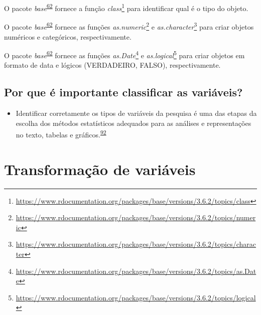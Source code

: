 \documentclass[
  a4paper,
]{book}
\providecommand{\tightlist}{%
  \setlength{\itemsep}{0pt}\setlength{\parskip}{0pt}}
\renewcommand{\href}[2]{#2\footnote{\url{#1}}}
\newenvironment{infobox}[1]
  {
  \begin{itemize}
  \renewcommand{\labelitemi}{
    \raisebox{-.7\height}[0pt][0pt]{
      {\setkeys{Gin}{width=3em,keepaspectratio}
        \texttt{[image: \#1]}}
    }
  }
  \setlength{\fboxsep}{1em}
  \begin{blackbox}
  \item
  }
  {
  \end{blackbox}
  \end{itemize}
  }
\begin{document}
\begin{infobox}{images/Rlogo}
O pacote \emph{base}\textsuperscript{\protect\hyperlink{ref-base-2}{62}} fornece a função \href{https://www.rdocumentation.org/packages/base/versions/3.6.2/topics/class}{\emph{class}} para identificar qual é o tipo do objeto.

\end{infobox}

\begin{infobox}{images/Rlogo}
O pacote \emph{base}\textsuperscript{\protect\hyperlink{ref-base-2}{62}} fornece as funções \href{https://www.rdocumentation.org/packages/base/versions/3.6.2/topics/numeric}{\emph{as.numeric}} e \href{https://www.rdocumentation.org/packages/base/versions/3.6.2/topics/character}{\emph{as.character}} para criar objetos numéricos e categóricos, respectivamente.

\end{infobox}

\begin{infobox}{images/Rlogo}
O pacote \emph{base}\textsuperscript{\protect\hyperlink{ref-base-2}{62}} fornece as funções \href{https://www.rdocumentation.org/packages/base/versions/3.6.2/topics/as.Date}{\emph{as.Date}} e \href{https://www.rdocumentation.org/packages/base/versions/3.6.2/topics/logical}{\emph{as.logical}} para criar objetos em formato de data e lógicos (VERDADEIRO, FALSO), respectivamente.

\end{infobox}

\hypertarget{por-que-uxe9-importante-classificar-as-variuxe1veis}{%
\subsection{Por que é importante classificar as variáveis?}\label{por-que-uxe9-importante-classificar-as-variuxe1veis}}

\begin{itemize}
\tightlist
\item
  Identificar corretamente os tipos de variáveis da pesquisa é uma das etapas da escolha dos métodos estatísticos adequados para as análises e representações no texto, tabelas e gráficos.\textsuperscript{\protect\hyperlink{ref-Dettori2018}{92}}
\end{itemize}

\hypertarget{transformacao}{%
\section{Transformação de variáveis}\label{transformacao}}
\end{document}
